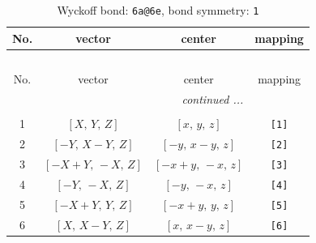 \documentclass[fleqn,8pt]{jsarticle}
\begin{document}
\begin{longtable}{cccc}
\caption{Wyckoff bond: {\tt 6a@6e}, bond symmetry: {\tt 1}}
 \\
 \hline \hline
No. & vector & center & mapping \\ \hline \endfirsthead

\multicolumn{3}{l}{\tablename\ \thetable{}} \\
 \hline \hline
No. & vector & center & mapping \\ \hline \endhead

 \hline \hline
\multicolumn{3}{r}{\footnotesize\it continued ...} \\ \endfoot

 \hline \hline
\multicolumn{3}{r}{} \\ \endlastfoot

1 & $\left[ X,\, Y,\, Z \right]$ & $\left[ x,\, y,\, z \right]$ & {\tt [1]} \\ \hline
2 & $\left[ - Y,\, X - Y,\, Z \right]$ & $\left[ - y,\, x - y,\, z \right]$ & {\tt [2]} \\ \hline
3 & $\left[ - X + Y,\, - X,\, Z \right]$ & $\left[ - x + y,\, - x,\, z \right]$ & {\tt [3]} \\ \hline
4 & $\left[ - Y,\, - X,\, Z \right]$ & $\left[ - y,\, - x,\, z \right]$ & {\tt [4]} \\ \hline
5 & $\left[ - X + Y,\, Y,\, Z \right]$ & $\left[ - x + y,\, y,\, z \right]$ & {\tt [5]} \\ \hline
6 & $\left[ X,\, X - Y,\, Z \right]$ & $\left[ x,\, x - y,\, z \right]$ & {\tt [6]} \\
\end{longtable}
\end{document}
